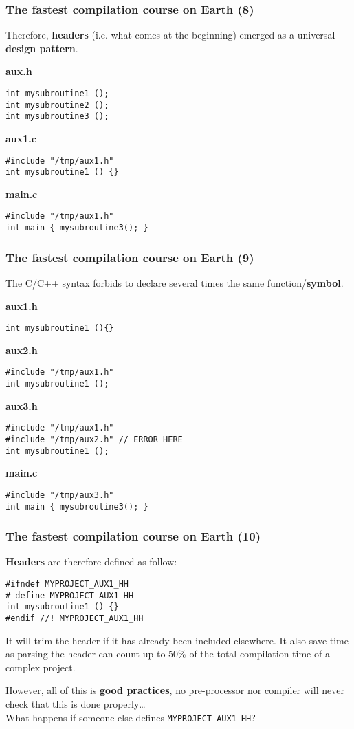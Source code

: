 \documentclass[hyperref={pdfpagelabels=false}]{beamer}
\begin{document}
\begin{frame}[fragile]
\frametitle{The fastest compilation course on Earth (8)}

Therefore, \textbf{headers} (i.e. what comes at the beginning) emerged
as a universal \textbf{design pattern}.

\textbf{aux.h}
\begin{verbatim}
int mysubroutine1 ();
int mysubroutine2 ();
int mysubroutine3 ();
\end{verbatim}

\textbf{aux1.c}
\begin{verbatim}
#include "/tmp/aux1.h"
int mysubroutine1 () {}
\end{verbatim}

\textbf{main.c}
\begin{verbatim}
#include "/tmp/aux1.h"
int main { mysubroutine3(); }
\end{verbatim}
\end{frame}


\begin{frame}[fragile]
\frametitle{The fastest compilation course on Earth (9)}

The C/C++ syntax forbids to declare several times the same
function/\textbf{symbol}.

\textbf{aux1.h}
\begin{verbatim}
int mysubroutine1 (){}
\end{verbatim}
\textbf{aux2.h}
\begin{verbatim}
#include "/tmp/aux1.h"
int mysubroutine1 ();
\end{verbatim}
\textbf{aux3.h}
\begin{verbatim}
#include "/tmp/aux1.h"
#include "/tmp/aux2.h" // ERROR HERE
int mysubroutine1 ();
\end{verbatim}

\textbf{main.c}
\begin{verbatim}
#include "/tmp/aux3.h"
int main { mysubroutine3(); }
\end{verbatim}
\end{frame}

\begin{frame}[fragile]
\frametitle{The fastest compilation course on Earth (10)}

\textbf{Headers} are therefore defined as follow:

\begin{verbatim}
#ifndef MYPROJECT_AUX1_HH
# define MYPROJECT_AUX1_HH
int mysubroutine1 () {}
#endif //! MYPROJECT_AUX1_HH
\end{verbatim}

It will trim the header if it has already been included elsewhere.
It also save time as parsing the header can count up to 50\% of the
total compilation time of a complex project.

However, all of this is \textbf{good practices}, no pre-processor nor
compiler will never check that this is done properly\ldots\\ What
happens if someone else defines \texttt{MYPROJECT\_AUX1\_HH}?

\end{frame}
\end{document}
